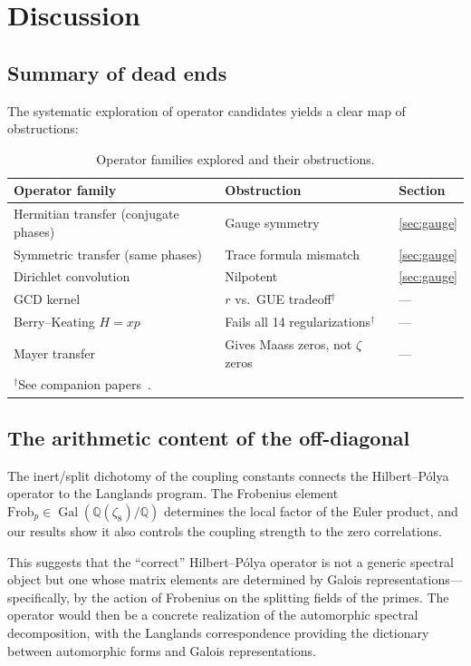 \documentclass[11pt,a4paper]{article}
\DeclareMathOperator{\Gal}{Gal}
\begin{document}
\section{Discussion}

\subsection{Summary of dead ends}

The systematic exploration of operator candidates yields a clear map of obstructions:

\begin{table}[ht]
\centering
\small
\begin{tabular}{@{}p{4.5cm}p{4cm}p{4cm}@{}}
\toprule
Operator family & Obstruction & Section \\
\midrule
Hermitian transfer (conjugate phases) & Gauge symmetry & \ref{sec:gauge} \\
Symmetric transfer (same phases) & Trace formula mismatch & \ref{sec:gauge} \\
Dirichlet convolution & Nilpotent & \ref{sec:gauge} \\
GCD kernel & $r$ vs.\ GUE tradeoff$^\dagger$ & --- \\
Berry--Keating $H = xp$ & Fails all 14 regularizations$^\dagger$ & --- \\
Mayer transfer & Gives Maass zeros, not $\zeta$ zeros & --- \\
\bottomrule
\multicolumn{3}{l}{\footnotesize $^\dagger$See companion papers~\cite{Paper1,Paper2}.}
\end{tabular}
\caption{Operator families explored and their obstructions.}
\label{tab:deadends}
\end{table}

\subsection{The arithmetic content of the off-diagonal}

The inert/split dichotomy of the coupling constants connects the Hilbert--P\'olya operator to the Langlands program.
The Frobenius element $\mathrm{Frob}_p \in \Gal(\mathbb{Q}(\zeta_8)/\mathbb{Q})$ determines the local factor of the Euler product, and our results show it also controls the coupling strength to the zero correlations.

This suggests that the ``correct'' Hilbert--P\'olya operator is not a generic spectral object but one whose matrix elements are determined by Galois representations---specifically, by the action of Frobenius on the splitting fields of the primes.
The operator would then be a concrete realization of the automorphic spectral decomposition, with the Langlands correspondence providing the dictionary between automorphic forms and Galois representations.
\end{document}
